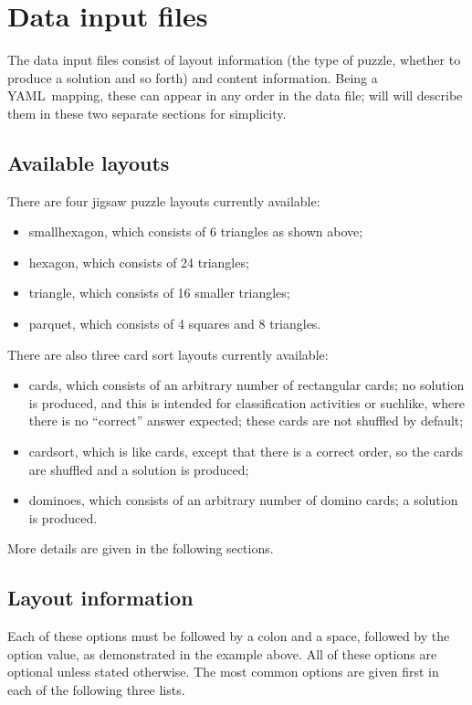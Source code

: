 \documentclass{article}
\def\YAML{{\small YAML}}
\begin{document}
\section{Data input files}

The data input files consist of layout information (the type of
puzzle, whether to produce a solution and so forth) and content
information.  Being a \YAML\ mapping, these can appear in any order in
the data file; will will describe them in these two separate sections
for simplicity.

\subsection{Available layouts}

There are four jigsaw puzzle layouts currently available:
\begin{itemize}
\item smallhexagon, which consists of 6 triangles as shown above;
\item hexagon, which consists of 24 triangles;
\item triangle, which consists of 16 smaller triangles;
\item parquet, which consists of 4 squares and 8 triangles.
\end{itemize}

There are also three card sort layouts currently available:
\begin{itemize}
\item cards, which consists of an arbitrary number of rectangular
  cards; no solution is produced, and this is intended for
  classification activities or suchlike, where there is no ``correct''
  answer expected; these cards are not shuffled by default;
\item cardsort, which is like cards, except that there is a correct
  order, so the cards are shuffled and a solution is produced;
\item dominoes, which consists of an arbitrary number of domino cards;
  a solution is produced.
\end{itemize}

More details are given in the following sections.

\subsection{Layout information}

Each of these options must be followed by a colon and a space,
followed by the option value, as demonstrated in the example above.
All of these options are optional unless stated otherwise.  The most
common options are given first in each of the following three lists.
\end{document}
